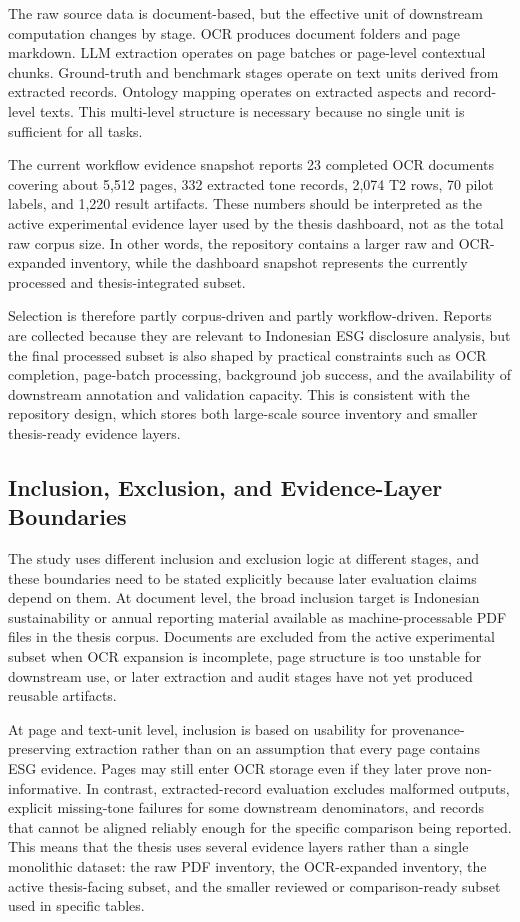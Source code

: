 \documentclass[english, online, cse, master]{dithesis}
\begin{document}
The raw source data is document-based, but the effective unit of downstream computation changes by stage. OCR produces document folders and page markdown. LLM extraction operates on page batches or page-level contextual chunks. Ground-truth and benchmark stages operate on text units derived from extracted records. Ontology mapping operates on extracted aspects and record-level texts. This multi-level structure is necessary because no single unit is sufficient for all tasks.

The current workflow evidence snapshot  reports 23 completed OCR documents covering about 5,512 pages, 332 extracted tone records, 2,074 T2 rows, 70 pilot labels, and 1,220 result artifacts. These numbers should be interpreted as the active experimental evidence layer used by the thesis dashboard, not as the total raw corpus size. In other words, the repository contains a larger raw and OCR-expanded inventory, while the dashboard snapshot represents the currently processed and thesis-integrated subset.

Selection is therefore partly corpus-driven and partly workflow-driven. Reports are collected because they are relevant to Indonesian ESG disclosure analysis, but the final processed subset is also shaped by practical constraints such as OCR completion, page-batch processing, background job success, and the availability of downstream annotation and validation capacity. This is consistent with the repository design, which stores both large-scale source inventory and smaller thesis-ready evidence layers.

\subsection{Inclusion, Exclusion, and Evidence-Layer Boundaries}

The study uses different inclusion and exclusion logic at different stages, and these boundaries need to be stated explicitly because later evaluation claims depend on them. At document level, the broad inclusion target is Indonesian sustainability or annual reporting material available as machine-processable PDF files in the thesis corpus. Documents are excluded from the active experimental subset when OCR expansion is incomplete, page structure is too unstable for downstream use, or later extraction and audit stages have not yet produced reusable artifacts.

At page and text-unit level, inclusion is based on usability for provenance-preserving extraction rather than on an assumption that every page contains ESG evidence. Pages may still enter OCR storage even if they later prove non-informative. In contrast, extracted-record evaluation excludes malformed outputs, explicit missing-tone failures for some downstream denominators, and records that cannot be aligned reliably enough for the specific comparison being reported. This means that the thesis uses several evidence layers rather than a single monolithic dataset: the raw PDF inventory, the OCR-expanded inventory, the active thesis-facing subset, and the smaller reviewed or comparison-ready subset used in specific tables.
\end{document}
